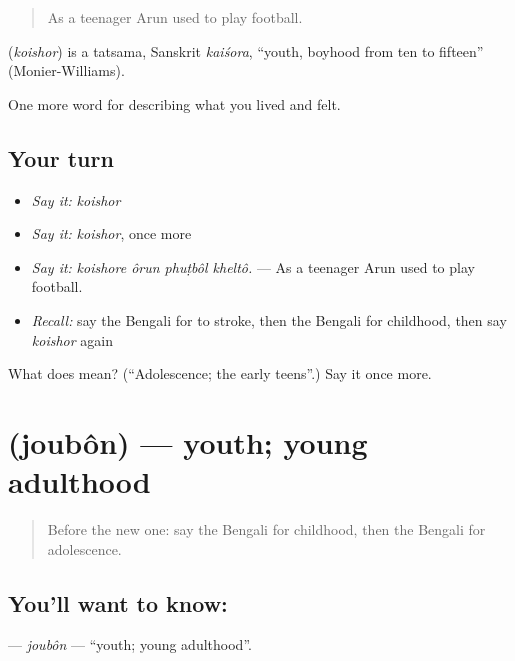 \begin{quote}
As a teenager Arun used to play football.
\end{quote}

\begin{cousinweb}
\textbf{} (\emph{koishor}) is a tatsama, Sanskrit \emph{kaiśora}, \textquotedblleft{}youth, boyhood from ten to fifteen\textquotedblright{} (Monier-Williams).
\end{cousinweb}

\begin{grammarlens}[title={What you've built}]
One more word for describing what you lived and felt.
\end{grammarlens}

\subsection*{Your turn}
\begin{itemize}
\raggedright
  \item \emph{Say it:} \emph{koishor}
  \item \emph{Say it:} \emph{koishor}, once more
  \item \emph{Say it:} \emph{koishore ôrun phuṭbôl kheltô.} — As a teenager Arun used to play football.
  \item \emph{Recall:} say the Bengali for to stroke, then the Bengali for childhood, then say \emph{koishor} again
\end{itemize}

\begin{tcolorbox}[breakable,colback=teal!4,colframe=teal!35!black,title={Before you move on}]
What does  mean? (\textquotedblleft{}Adolescence; the early teens\textquotedblright{}.) Say it once more.
\end{tcolorbox}
\section[\texorpdfstring{\bn{যৌবন} (joubôn)}{যৌবন (joubôn)}]{ (joubôn) — youth; young adulthood}

\label{lesson:BN-C488-joubon}



\begin{quote}
Before the new one: say the Bengali for childhood, then the Bengali for adolescence.
\end{quote}

\subsection*{You'll want to know: }
\textbf{} — \emph{joubôn} — \textquotedblleft{}youth; young adulthood\textquotedblright{}.

